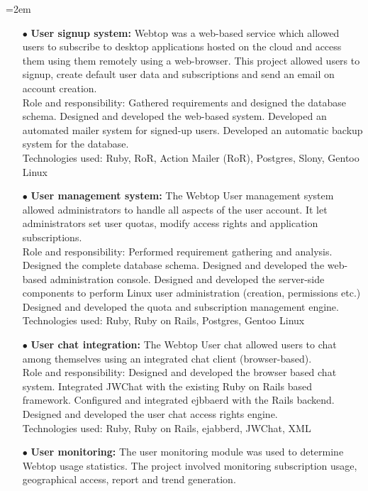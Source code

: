 \documentclass{scrartcl}
\newcommand{\MarginDate}[1]{\marginpar{\raggedleft\itshape\small#1}}
\newcommand{\Description}[1]{\hangindent=2em\hangafter=0\noindent\raggedright\footnotesize{#1}\par\normalsize}
\begin{document}
\begin{cv}{
\href{http://www.develmj.com}{}
}
\Description{
\begin{itemize}
\item[\footnotesize$\bullet$] \textbf{User signup system: }{\scriptsize Webtop was a web-based service which \MarginDate{Atlantis Webtop}allowed users to
    subscribe to desktop applications hosted on the cloud and access them using
    them remotely using a web-browser. This project allowed users to signup,
    create default user data and subscriptions and send an email on account
    creation.}\\
  \vspace{0.5em}
    Role and responsibility: {\scriptsize Gathered requirements and
      designed the database schema. Designed and developed the
      web-based system. Developed an automated mailer system for
      signed-up users. Developed an automatic backup system for the
      database.}\\
\vspace{0.5em}
    Technologies used: {\scriptsize Ruby, RoR, Action Mailer (RoR), Postgres, Slony,
Gentoo Linux}
  \item[\footnotesize$\bullet$] \textbf{User management system:
  }{\scriptsize The Webtop User management system allowed
administrators to handle all aspects of the user account. It let administrators
set user quotas, modify access rights and application
subscriptions.}\\
    \vspace{0.5em}
    Role and responsibility: {\scriptsize Performed requirement gathering
      and analysis. Designed the complete database schema. Designed and
      developed the web-based administration console. Designed and
      developed the server-side components to perform Linux user
      administration (creation, permissions etc.) Designed and developed
      the quota and subscription management engine.}\\
    \vspace{0.5em}
    Technologies used: {\scriptsize Ruby, Ruby on Rails, Postgres, Gentoo Linux}
  \item[\footnotesize$\bullet$] \textbf{User chat integration:
  }{\scriptsize The Webtop User chat allowed users to chat among
    themselves using an integrated chat client (browser-based).}\\
\vspace{0.5em}
    Role and responsibility: {\scriptsize Designed and developed the
      browser based chat system. Integrated JWChat with the existing
      Ruby on Rails based framework. Configured and integrated
      ejbbaerd with the Rails backend. Designed and developed the user
      chat access rights engine.}\\
    \vspace{0.5em}
    Technologies used: {\scriptsize Ruby, Ruby on Rails, ejabberd, JWChat, XML}
  \item[\footnotesize$\bullet$] \textbf{User monitoring: }{\scriptsize The user monitoring module was used to determine
    Webtop usage statistics. The project involved monitoring subscription usage,
    geographical access, report and trend generation.}\\


\end{itemize}}
\end{cv}
\end{document}
